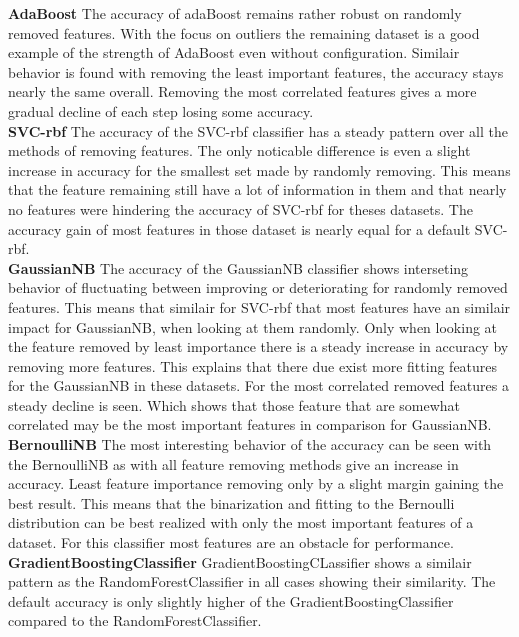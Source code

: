 \documentclass[a4paper,10pt]{article}
\begin{document}
\textbf{AdaBoost} The accuracy of adaBoost remains rather robust on randomly removed features. With the focus on outliers the remaining dataset is a good example of the strength of AdaBoost even without configuration. Similair behavior is found with removing the least important features, the accuracy stays nearly the same overall. Removing the most correlated features gives a more gradual decline of each step losing some accuracy.   \\

\textbf{SVC-rbf} The accuracy of the SVC-rbf classifier has a steady pattern over all the methods of removing features. The only noticable difference is even a slight increase in accuracy for the smallest set made by randomly removing. This means that the feature remaining still have a lot of information in them and that nearly no features were hindering the accuracy of SVC-rbf for theses datasets. The accuracy gain of most features in those dataset is nearly equal for a default SVC-rbf.   \\

\textbf{GaussianNB} The accuracy of the GaussianNB classifier shows interseting behavior of fluctuating between improving or deteriorating for randomly removed features. This means that similair for SVC-rbf that most features have an similair impact for GaussianNB, when looking at them randomly. Only when looking at the feature removed by least importance there is a steady increase in accuracy by removing more features. This explains that there due exist more fitting features for the GaussianNB in these datasets. For the most correlated removed features a steady decline is seen. Which shows that those feature that are somewhat correlated may be the most important features in comparison for GaussianNB. \\

\textbf{BernoulliNB} The most interesting behavior of the accuracy can be seen with the BernoulliNB as with all feature removing methods give an increase in accuracy. Least feature importance removing only by a slight margin gaining the best result. This means that the binarization and fitting to the Bernoulli distribution can be best realized with only the most important features of a dataset. For this classifier most features are an obstacle for performance. \\

\textbf{GradientBoostingClassifier} GradientBoostingCLassifier shows a similair pattern as the RandomForestClassifier in all cases showing their similarity. The default accuracy is only slightly higher of the GradientBoostingClassifier compared to the RandomForestClassifier. \\
\end{document}
